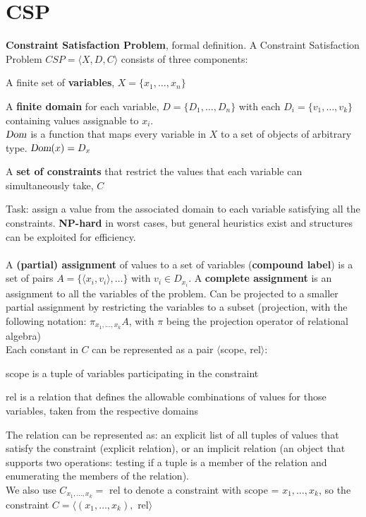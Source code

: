 \documentclass[10pt]{report}
\begin{document}
\section{CSP} \textbf{Constraint Satisfaction Problem}, formal definition.
A Constraint Satisfaction Problem $CSP = \langle X, D, C\rangle$ consists of three components: \begin{list}{}{}
	\item A finite set of \textbf{variables}, $X = \{x_1, \ldots, x_n\}$
	\item A \textbf{finite domain} for each variable, $D = \{D_1, \ldots, D_n\}$ with each $D_i = \{v_1, \ldots, v_k\}$ containing values assignable to $x_i$.\\
	$\textsl{Dom}$ is a function that maps every variable in $X$ to a set of objects of arbitrary type. $\textsl{Dom}(x) = D_x$
	\item A \textbf{set of constraints} that restrict the values that each variable can simultaneously take, $C$
\end{list}
Task: assign a value from the associated domain to each variable satisfying all the constraints. \textbf{NP-hard} in worst cases, but general heuristics exist and structures can be exploited for efficiency.\\\\
A \textbf{(partial) assignment} of values to a set of variables (\textbf{compound label}) is a set of pairs $A=\{\langle x_i, v_i\rangle, \ldots\}$ with $v_i \in D_{x_i}$. A \textbf{complete assignment} is an assignment to all the variables of the problem. Can be projected to a smaller partial assignment by restricting the variables to a subset (projection, with the following notation: $\pi_{x_1,\ldots,x_k} A$, with $\pi$ being the projection operator of relational algebra)\\
Each constant in $C$ can be represented as a pair $\langle$scope, rel$\rangle$:\begin{list}{}{}
	\item scope is a tuple of variables participating in the constraint
	\item rel is a relation that defines the allowable combinations of values for those variables, taken from the respective domains
\end{list}
The relation can be represented as: an explicit list of all tuples of values that satisfy the constraint (explicit relation), or an implicit relation (an object that supports two operations: testing if a tuple is a member of the relation and enumerating the members of the relation).\\
We also use $C_{x_1,\ldots,x_k} =$ rel to denote a constraint with scope = $x_1,\ldots,x_k$, so the constraint $C=\langle(x_1,\ldots,x_k),$ rel$\rangle$
\end{document}
